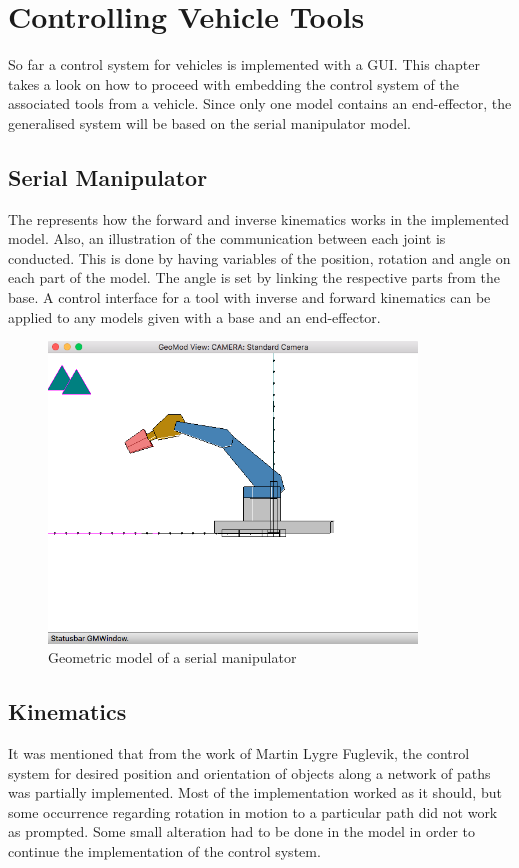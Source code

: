 \chapter{Controlling Vehicle Tools}

So far a control system for vehicles is implemented with a GUI. This chapter takes a look on how to proceed with embedding the control system of the associated tools from a vehicle. Since only one model contains an end-effector, the generalised system will be based on the serial manipulator model.

\section{Serial Manipulator}

The  represents how the forward and inverse kinematics works in the implemented model. Also, an illustration of the communication between each joint is conducted. This is done by having variables of the position, rotation and angle on each part of the model. The angle is set by linking the respective parts from the base. A control interface for a tool with inverse and forward kinematics can be applied to any models given with a base and an end-effector. 


\begin{figure}[ht]
    \centering
    \includegraphics[height=8cm]{images/GeometricModel.png}
    \caption[Geometric model of a serial manipulator]{Geometric model of a serial manipulator}
    \label{fig:SerialManipulator}
\end{figure}


\section{Kinematics}
It was mentioned that from the work of Martin Lygre Fuglevik, the control system for desired position and orientation of objects along a network of paths was partially implemented. Most of the implementation worked as it should, but some occurrence regarding rotation in motion to a particular path did not work as prompted. Some small alteration had to be done in the model in order to continue the implementation of the control system. 

